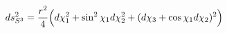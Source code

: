\begin{equation}
\label{roundS3dual}
ds_{S^3}^2=\frac{r^2}{4}\Bigl(d\chi_1^2+\sin^2{\chi_1}d\chi_2^2+
(d\chi_3+\cos{\chi_1}d\chi_2)^2\Bigr)
\end{equation}

